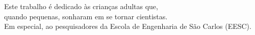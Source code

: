 Este trabalho é dedicado às crianças adultas que,\\
quando pequenas, sonharam em se tornar cientistas. \\
Em especial, ao pesquisadores da Escola de Engenharia de São Carlos (EESC).

